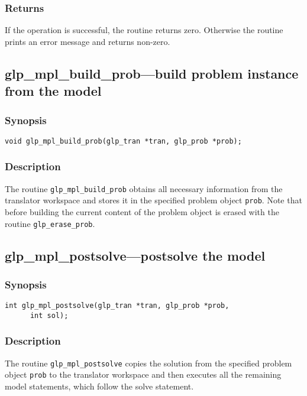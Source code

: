 \subsubsection*{Returns}

If the operation is successful, the routine returns zero. Otherwise
the routine prints an error message and returns non-zero.

\subsection{glp\_mpl\_build\_prob---build problem instance from the
model}

\subsubsection*{Synopsis}

\begin{verbatim}
void glp_mpl_build_prob(glp_tran *tran, glp_prob *prob);
\end{verbatim}

\subsubsection*{Description}

The routine \verb|glp_mpl_build_prob| obtains all necessary information
from the translator workspace and stores it in the specified problem
object \verb|prob|. Note that before building the current content of
the problem object is erased with the routine \verb|glp_erase_prob|.

\subsection{glp\_mpl\_postsolve---postsolve the model}

\subsubsection*{Synopsis}

\begin{verbatim}
int glp_mpl_postsolve(glp_tran *tran, glp_prob *prob,
      int sol);
\end{verbatim}

\subsubsection*{Description}

The routine \verb|glp_mpl_postsolve| copies the solution from the
specified problem object \verb|prob| to the translator workspace and
then executes all the remaining model statements, which follow the
solve statement.

